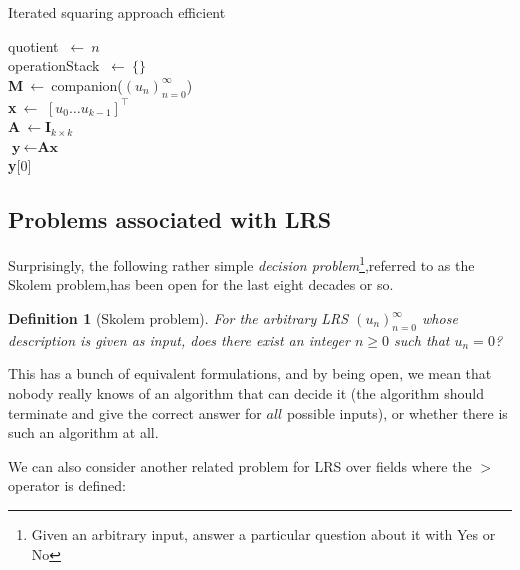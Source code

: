 \documentclass{article}
\theoremstyle{definition}
\newtheorem{definition}{Definition}[section]
\begin{document}
\begin{algorithm}

\caption{Iterated squaring approach efficient}\label{alg:three}

     quotient $\ \gets\ n $\\
     operationStack $\ \gets\ \{\} $\\
     \textbf{M}$\ \gets\ $companion($(u_n)_{n=0}^{\infty}$)  \\
     \textbf{x}$\ \gets $ $[u_0 \dots u_{k-1}]^\top $  \\
     \textbf{A}$\ \gets \textbf{I}_{k\times k}$ \\
 $\textbf{y} \ \gets  \textbf{Ax} $\\
\Return \textbf{y}[0]

\end{algorithm}



\subsection{Problems associated with LRS}
Surprisingly, the following rather simple \textit{decision problem}\footnote{Given
an arbitrary input, answer a particular question about it with Yes or No},referred to as the Skolem problem,has been open for the last eight decades or so.

\begin{definition}[Skolem problem]
\emph{For the arbitrary LRS $(u_n)_{n=0}^{\infty}$ whose description is given as input, does there exist an integer $n \geq 0$ such that $u_n = 0$?}
\end{definition}

This has a bunch of equivalent formulations, and by being open, we mean that nobody really knows of an algorithm that can decide it (the algorithm should terminate and give the correct answer for $all$ possible inputs), or whether there is such an algorithm at all.

We can also consider another related problem for LRS over fields where the $>$ operator is defined:
\end{document}
